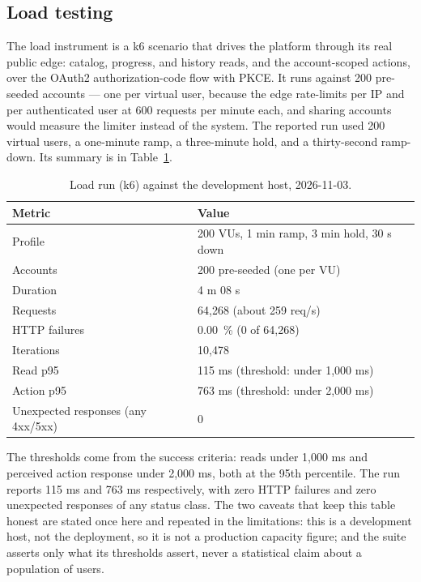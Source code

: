 \subsection{Load testing}

The load instrument is a k6 scenario that drives the platform through its real public edge: catalog,
progress, and history reads, and the account-scoped actions, over the OAuth2 authorization-code
flow with PKCE. It runs against 200 pre-seeded accounts — one per virtual user, because the edge
rate-limits per IP and per authenticated user at 600 requests per minute each, and sharing accounts
would measure the limiter instead of the system. The reported run used 200 virtual users, a
one-minute ramp, a three-minute hold, and a thirty-second ramp-down. Its summary is in
Table~\ref{tab:load}.

\begin{table}[htbp]
  \centering
  \begin{tabular}{ll}
    \hline
    Metric & Value \\
    \hline
    Profile & 200 VUs, 1 min ramp, 3 min hold, 30 s down \\
    Accounts & 200 pre-seeded (one per VU) \\
    Duration & 4 m 08 s \\
    Requests & 64,268 (about 259 req/s) \\
    HTTP failures & 0.00~\% (0 of 64,268) \\
    Iterations & 10,478 \\
    Read p95 & 115 ms (threshold: under 1,000 ms) \\
    Action p95 & 763 ms (threshold: under 2,000 ms) \\
    Unexpected responses (any 4xx/5xx) & 0 \\
    \hline
  \end{tabular}
  \caption{Load run (k6) against the development host, 2026-11-03.}
  \label{tab:load}
\end{table}

The thresholds come from the success criteria: reads under 1,000 ms and perceived action response
under 2,000 ms, both at the 95th percentile. The run reports 115 ms and 763 ms respectively, with
zero HTTP failures and zero unexpected responses of any status class. The two caveats that keep this
table honest are stated once here and repeated in the limitations: this is a development host, not
the deployment, so it is not a production capacity figure; and the suite asserts only what its
thresholds assert, never a statistical claim about a population of users.


